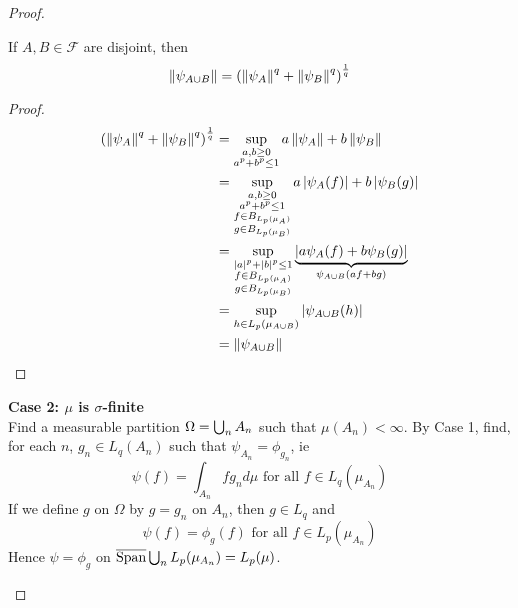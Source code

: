 \documentclass{article}
\begin{document}
\begin{proof}
\begin{enumerate}
    \begin{claim}
      If $A, B \in \mathcal F$ are disjoint, then
      $$\left\lVert \psi_{A \cup B}\right\rVert = \left(\left\lVert \psi_A\right\rVert^q + \left\lVert \psi_B\right\rVert^q\right)^{\frac 1q}$$
    \end{claim}
    \begin{proof}
      \begin{align*}
        \left(\left\lVert \psi_A\right\rVert^q + \left\lVert \psi_B\right\rVert^q\right)^{\frac 1q}
        & = \sup_{\substack{a, b \ge 0 \\ a^p + b^p \le 1}} a\left\lVert \psi_A\right\rVert + b\left\lVert \psi_B\right\rVert \\
        & = \sup_{\substack{a, b \ge 0 \\ a^p + b^p \le 1 \\ f \in B_{L_p(\mu_A)} \\ g \in B_{L_p(\mu_B)}}} a\left\lvert \psi_A(f)\right\rvert + b\left\lvert \psi_B(g)\right\rvert \\
        & = \sup_{\substack{\left\lvert a\right\rvert^p + \left\lvert b\right\rvert^p \le 1 \\ f \in B_{L_p(\mu_A)} \\ g \in B_{L_p(\mu_B)}}} \underbrace{\left\lvert a\psi_A(f) + b\psi_B(g)\right\rvert}_{\psi_{A \cup B}(af + bg)} \\
        & = \sup_{h \in L_p(\mu_{A \cup B})} \left\lvert \psi_{A \cup B}(h)\right\rvert \\
        & = \left\lVert \psi_{A \cup B}\right\rVert
      \end{align*}
    \end{proof}

    {\bf Case 2: $\mu$ is $\sigma$-finite} \\
    Find a measurable partition $\Omega = \bigcup_n A_n$ such that $\mu(A_n) < \infty$. By Case 1, find, for each $n$, $g_n \in L_q(A_n)$ such that $\psi_{A_n} = \phi_{g_n}$, ie
    $$\psi(f) = \int_{A_n} fg_n d\mu \text{ for all } f \in L_q(\mu_{A_n})$$
    If we define $g$ on $\Omega$ by $g = g_n$ on $A_n$, then $g \in L_q$ and
    $$\psi(f) = \phi_g(f) \text{ for all } f \in L_p(\mu_{A_n})$$
    Hence $\psi = \phi_g$ on $\overline{\mathrm{Span}}\bigcup_n L_p(\mu_{A_n}) = L_p(\mu)$.


\end{enumerate}
\end{proof}
\end{document}
